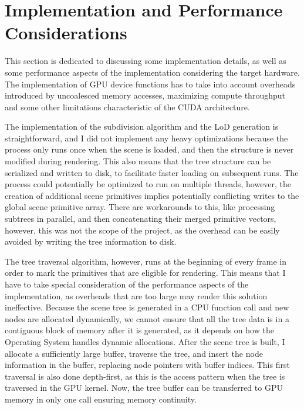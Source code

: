 \section{Implementation and Performance Considerations}
This section is dedicated to discussing some implementation details, as well as some performance aspects of the implementation considering the target hardware. The implementation of GPU device functions has to take into account overheads introduced by uncoalesced memory accesses, maximizing compute throughput and some other limitations characteristic of the CUDA architecture.

The implementation of the subdivision algorithm and the LoD generation is straightforward, and I did not implement any heavy optimizations because the process only runs once when the scene is loaded, and then the structure is never modified during rendering. This also means that the tree structure can be serialized and written to disk, to facilitate faster loading on subsequent runs. The process could potentially be optimized to run on multiple threads, however, the creation of additional scene primitives implies potentially conflicting writes to the global scene primitive array. There are workarounds to this, like processing subtrees in parallel, and then concatenating their merged primitive vectors, however, this was not the scope of the project, as the overhead can be easily avoided by writing the tree information to disk.

The tree traversal algorithm, however, runs at the beginning of every frame in order to mark the primitives that are eligible for rendering. This means that I have to take special consideration of the performance aspects of the implementation, as overheads that are too large may render this solution ineffective. Because the scene tree is generated in a CPU function call and new nodes are allocated dynamically, we cannot ensure that all the tree data is in a contiguous block of memory after it is generated, as it depends on how the Operating System handles dynamic allocations. After the scene tree is built, I allocate a sufficiently large buffer, traverse the tree, and insert the node information in the buffer, replacing node pointers with buffer indices. This first traversal is also done depth-first, as this is the access pattern when the tree is traversed in the GPU kernel. Now, the tree buffer can be transferred to GPU memory in only one call ensuring memory continuity.

